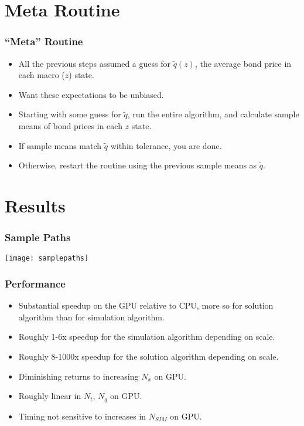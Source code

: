 \documentclass[handout]{beamer}
\theoremstyle{definition}
\begin{document}
\section{Meta Routine}

\begin{frame}
  \frametitle{``Meta'' Routine}
  \begin{itemize}[<+->]
  \item All the previous steps assumed a guess for $\tilde{q}(z)$, the average bond price in each macro ($z$) state.
  \item Want these expectations to be unbiased.
  \item Starting with some guess for $\tilde{q}$, run the entire algorithm, and calculate sample means of bond prices in each $z$ state.
  \item If sample means match $\tilde{q}$ within tolerance, you are done.
  \item Otherwise, restart the routine using the previous sample means as $\tilde{q}$.
  \end{itemize}
\end{frame}

\section{Results}

\begin{frame}
	\frametitle{Sample Paths}
	\texttt{[image: samplepaths]}
\end{frame}

\begin{frame}
  \frametitle{Performance}
  \begin{itemize}[<+->]
  \item Substantial speedup on the GPU relative to CPU, more so for solution algorithm than for simulation algorithm.
  \item Roughly 1-6x speedup for the simulation algorithm depending on scale.
  \item Roughly 8-1000x speedup for the solution algorithm depending on scale.
  \item Diminishing returns to increasing $N_x$ on GPU.
  \item Roughly linear in $N_t$, $N_q$ on GPU.
  \item Timing not sensitive to increases in $N_{SIM}$ on GPU.
  \end{itemize}
\end{frame}
  
\end{document}
